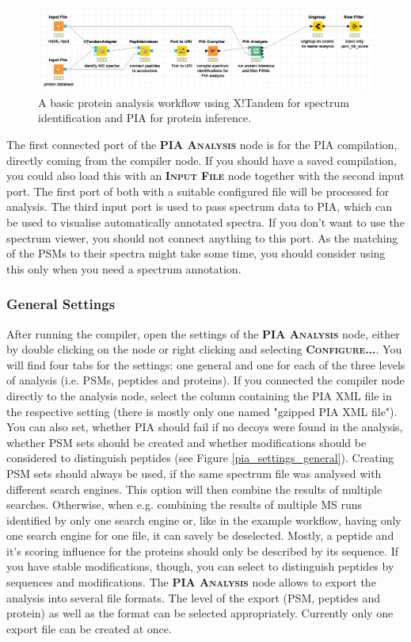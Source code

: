 \documentclass[a4paper,11pt,twoside]{article}
\newcommand{\menu}[1]{{\scshape\bfseries #1}}
\newcommand{\knimenode}[1]{{\scshape\bfseries #1}}
\begin{document}
\begin{figure}[ht!]
	\centering
	\includegraphics[width=\textwidth]{graphics/first_analysis_workflow}
	\caption{A basic protein analysis workflow using X!Tandem for spectrum
	identification and PIA for protein inference.}
\end{figure}

The first connected port of the \knimenode{PIA Analysis} node is for the PIA
compilation, directly coming from the compiler node. If you should have a saved
compilation, you could also load this with an \knimenode{Input File} node
together with the second input port. The first port of both with a suitable
configured file will be processed for analysis. The third input port is used to
pass spectrum data to PIA, which can be used to visualise automatically
annotated spectra. If you don't want to use the spectrum viewer, you should not
connect anything to this port. As the matching of the PSMs to their spectra
might take some time, you should consider using this only when you need a
spectrum annotation.


\subsubsection{General Settings}

After running the compiler, open the settings of the \knimenode{PIA Analysis}
node, either by double clicking on the node or right clicking and selecting
\menu{Configure...}. You will find four tabs for the settings: one general and
one for each of the three levels of analysis (i.e. PSMs, peptides and proteins).
If you connected the compiler node directly to the analysis node, select the
column containing the PIA XML file in the respective setting (there is mostly
only one named "gzipped PIA XML file"). You can also set, whether PIA should
fail if no decoys were found in the analysis, whether PSM sets should be created
and whether modifications should be considered to distinguish peptides (see
Figure \ref{pia_settings_general}). Creating PSM sets should always be used, if
the same spectrum file was analysed with different search engines. This option
will then combine the results of multiple searches. Otherwise, when e.g.
combining the results of multiple MS runs identified by only one search engine
or, like in the example workflow, having only one search engine for one file, it
can savely be deselected. Mostly, a peptide and it's scoring influence for the
proteins should only be described by its sequence. If you have stable
modifications, though, you can select to distinguish peptides by sequences and
modifications. The \knimenode{PIA Analysis} node allows to export the analysis
into several file formats. The level of the export (PSM, peptides and protein)
as well as the format can be selected appropriately. Currently only one export
file can be created at once.
\end{document}
